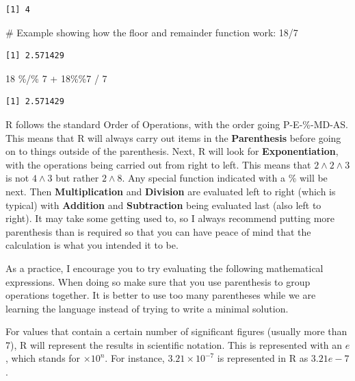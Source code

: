 \documentclass[
  letterpaper,
  DIV=11,
  numbers=noendperiod]{scrreprt}
\newenvironment{Shaded}{\begin{snugshade}}{\end{snugshade}}
\newcommand{\CommentTok}[1]{\textcolor[rgb]{0.37,0.37,0.37}{#1}}
\newcommand{\DecValTok}[1]{\textcolor[rgb]{0.68,0.00,0.00}{#1}}
\newcommand{\SpecialCharTok}[1]{\textcolor[rgb]{0.37,0.37,0.37}{#1}}
\begin{document}
\begin{verbatim}
[1] 4
\end{verbatim}

\begin{Shaded}
\begin{Highlighting}[]
\CommentTok{\# Example showing how the floor and remainder function work:}
\DecValTok{18}\SpecialCharTok{/}\DecValTok{7}
\end{Highlighting}
\end{Shaded}

\begin{verbatim}
[1] 2.571429
\end{verbatim}

\begin{Shaded}
\begin{Highlighting}[]
\DecValTok{18} \SpecialCharTok{\%/\%} \DecValTok{7} \SpecialCharTok{+} \DecValTok{18}\SpecialCharTok{\%\%}\DecValTok{7} \SpecialCharTok{/} \DecValTok{7}
\end{Highlighting}
\end{Shaded}

\begin{verbatim}
[1] 2.571429
\end{verbatim}

R follows the standard Order of Operations, with the order going
P-E-\%-MD-AS. This means that R will always carry out items in the
\textbf{Parenthesis} before going on to things outside of the
parenthesis. Next, R will look for \textbf{Exponentiation}, with the
operations being carried out from right to left. This means that
\(2 \wedge 2 \wedge 3\) is not \(4 \wedge 3\) but rather \(2\wedge8\).
Any special function indicated with a \% will be next. Then
\textbf{Multiplication} and \textbf{Division} are evaluated left to
right (which is typical) with \textbf{Addition} and \textbf{Subtraction}
being evaluated last (also left to right). It may take some getting used
to, so I always recommend putting more parenthesis than is required so
that you can have peace of mind that the calculation is what you
intended it to be.

As a practice, I encourage you to try evaluating the following
mathematical expressions. When doing so make sure that you use
parenthesis to group operations together. It is better to use too many
parentheses while we are learning the language instead of trying to
write a minimal solution.

For values that contain a certain number of significant figures (usually
more than 7), R will represent the results in scientific notation. This
is represented with an \(e\), which stands for \(\times 10^n\). For
instance, \(3.21\times 10^{-7}\) is represented in R as \(3.21e-7\).
\end{document}

